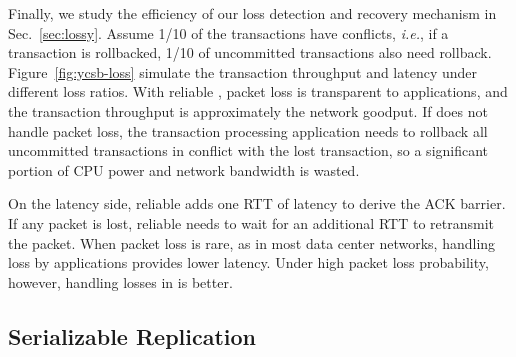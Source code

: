 Finally, we study the efficiency of our loss detection and recovery mechanism in Sec.~\ref{sec:lossy}.
Assume 1/10 of the transactions have conflicts, \textit{i.e.}, if a transaction is rollbacked, 1/10 of uncommitted transactions also need rollback.
Figure~\ref{fig:ycsb-loss} simulate the transaction throughput and latency under different loss ratios. With reliable \sys, packet loss is transparent to applications, and the transaction throughput is approximately the network goodput. If \sys does not handle packet loss, the transaction processing application needs to rollback all uncommitted transactions in conflict with the lost transaction, so a significant portion of CPU power and network bandwidth is wasted.

On the latency side, reliable \sys adds one RTT of latency to derive the ACK barrier. If any packet is lost, reliable \sys needs to wait for an additional RTT to retransmit the packet. When packet loss is rare, as in most data center networks, handling loss by applications provides lower latency. Under high packet loss probability, however, handling losses in \sys is better.

\subsection{Serializable Replication}
\label{subsec:eval-replication}



